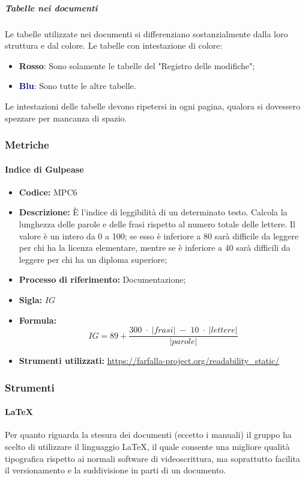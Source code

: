 \subparagraph*{Tabelle nei documenti}
Le tabelle utilizzate nei documenti si differenziano sostanzialmente dalla loro struttura e dal colore.
Le tabelle con intestazione di colore:
\begin{itemize}
    \item \textcolor{rossoep}{\textbf{Rosso}}: Sono solamente le tabelle del "Registro delle modifiche";
    \item \textcolor{darkblue}{\textbf{Blu}}: Sono tutte le altre tabelle.
\end{itemize}
Le intestazioni delle tabelle devono ripetersi in ogni pagina, qualora si dovessero spezzare per mancanza di spazio.

\subsubsection{Metriche}

\paragraph{Indice di Gulpease}
\begin{itemize}
	\item \textbf{Codice:} MPC6
	\item \textbf{Descrizione:} È l'indice di leggibilità di un determinato testo. Calcola la lunghezza delle parole e delle frasi rispetto al numero totale delle lettere. Il valore è un intero da 0 a 100; se esso è inferiore a 80 sarà difficile da leggere per chi ha la licenza elementare, mentre se è inferiore a 40 sarà difficili da leggere per chi ha un diploma superiore;
	\item \textbf{Processo di riferimento:} Documentazione;
	\item \textbf{Sigla:} $IG$
	\item \textbf{Formula:} $$IG = 89 + {\frac{300 \; \cdot \; |frasi| \; - \; 10 \; \cdot \; |lettere|}{|parole|}}$$
	\item \textbf{Strumenti utilizzati:} \url{https://farfalla-project.org/readability_static/}
\end{itemize}

\subsubsection{Strumenti}
\paragraph*{\LaTeX}
Per quanto riguarda la stesura dei documenti (eccetto i manuali) il gruppo ha scelto di utilizzare il linguaggio \LaTeX{}, il quale consente una migliore qualità tipografica rispetto ai normali software di videoscrittura, ma soprattutto facilita il versionamento e la suddivisione in parti di un documento.


